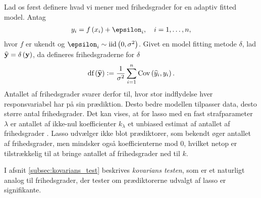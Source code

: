 Lad os først definere hvad vi mener med frihedsgrader for en adaptiv fitted model. 
Antag
\begin{align*}
y_i = f \del{x_i} + \epsilon_i, \quad i = 1, \ldots, n,
\end{align*}
hvor \(f\) er ukendt og \(\epsilon_i \sim \text{iid} \del{0, \sigma^2}\).
Givet en model fitting metode \(\delta\), lad \(\widehat{\y} = \delta \del{\y}\), da defineres frihedsgraderne for \(\delta\) 
\begin{align}
\text{df}\del{\widehat{\y}} := \frac{1}{\sigma^2} \sum_{i=1}^n \text{Cov}\del{\widehat{y}_i, y_i}. \label{eq:df_lasso}
\end{align}
Antallet af frihedsgrader svarer derfor til, hvor stor indflydelse hver responsvariabel har på sin prædiktion.
Desto bedre modellen tilpasser data, desto større antal frihedsgrader.
Det kan vises, at for lasso med en fast strafparameter \(\lambda\) er antallet af ikke-nul koefficienter \(k_\lambda\) et unbiased estimat af antallet af frihedsgrader \citep{df_lasso}.
%
Lasso udvælger ikke blot prædiktorer, som bekendt øger antallet af frihedsgrader, men mindsker også koefficienterne mod 0, hvilket netop er tilstrækkelig til at bringe antallet af frihedsgrader ned til \(k\).

I afsnit \ref{subsec:kovarians_test} beskrives \textit{kovarians testen}, som er et naturligt analog til frihedsgrader, der tester om prædiktorerne udvalgt af lasso er signifikante.

